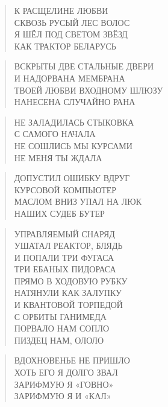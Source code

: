 \poemtitle{***}
\begin{verse}
К РАСЩЕЛИНЕ ЛЮБВИ\\
СКВОЗЬ РУСЫЙ ЛЕС ВОЛОС\\
Я ШЁЛ ПОД СВЕТОМ ЗВЁЗД\\
КАК ТРАКТОР БЕЛАРУСЬ
\end{verse}

\poemtitle{***}
\begin{verse}
ВСКРЫТЫ ДВЕ СТАЛЬНЫЕ ДВЕРИ\\
И НАДОРВАНА МЕМБРАНА\\
ТВОЕЙ ЛЮБВИ ВХОДНОМУ ШЛЮЗУ\\
НАНЕСЕНА СЛУЧАЙНО РАНА
\end{verse}

\poemtitle{***}
\begin{verse}
НЕ ЗАЛАДИЛАСЬ СТЫКОВКА \\
С САМОГО НАЧАЛА\\
НЕ СОШЛИСЬ МЫ КУРСАМИ\\
НЕ МЕНЯ ТЫ ЖДАЛА
\end{verse}

\poemtitle{***}
\begin{verse}
ДОПУСТИЛ ОШИБКУ ВДРУГ\\
КУРСОВОЙ КОМПЬЮТЕР\\
МАСЛОМ ВНИЗ УПАЛ НА ЛЮК\\
НАШИХ СУДЕБ БУТЕР
\end{verse}

\poemtitle{***}
\begin{verse}
УПРАВЛЯЕМЫЙ СНАРЯД\\
УШАТАЛ РЕАКТОР, БЛЯДЬ\\
И ПОПАЛИ ТРИ ФУГАСА\\
ТРИ ЕБАНЫХ ПИДОРАСА\\
ПРЯМО В ХОДОВУЮ РУБКУ\\
НАТЯНУЛИ КАК ЗАЛУПКУ\\
И КВАНТОВОЙ ТОРПЕДОЙ\\
С ОРБИТЫ ГАНИМЕДА\\
ПОРВАЛО НАМ СОПЛО\\
ПИЗДЕЦ НАМ, ОЛОЛО
\end{verse}

\poemtitle{***}
\begin{verse}
ВДОХНОВЕНЬЕ НЕ ПРИШЛО\\
ХОТЬ ЕГО Я ДОЛГО ЗВАЛ\\
ЗАРИФМУЮ Я «ГОВНО»\\
ЗАРИФМУЮ Я И «КАЛ»
\end{verse}

